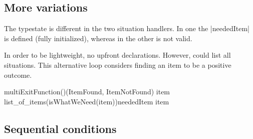 \documentclass[10pt]{amsart}
\begin{document}
\subsection{More variations}


The typestate is different in the two situation handlers.  In one the
|neededItem| is defined (fully initialized), whereas in the other is
not valid.

In order to be lightweight, no upfront declarations.  However, could
list all situations.  This alternative loop considers finding an item
to be a positive outcome.
\begin{codex}
\begin{offsideBlue}
\begin{PVerbatim}
  \ckw[function] multiExitFunction()\cop[:]
  \cop[|$$$](ItemFound, ItemNotFound)
      \ckw[loop] item \ckw[through] list_of_items\cop[:]
          \ckw[if] (isWhatWeNeed(item))\cop[:]
              neededItem \cop[:=] item
              \cgoto\csituation[ItemFound]
          \cend
      \cend
      \cgoto\csituation[ItemNotFound]

  \csitop\csituation[ItemFound]\cop[:]
  \csitop\csituation[ItemNotFound]\cop[:]
  \cend
\end{PVerbatim}
\end{offsideBlue}
\end{codex}



\subsection{Sequential conditions}
\end{document}
